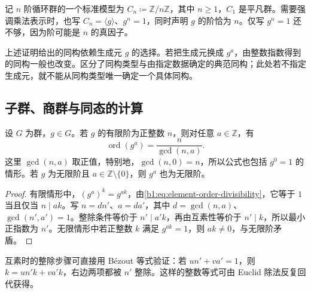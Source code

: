 记 \(n\) 阶循环群的一个标准模型为 \(C_n\coloneqq\mathbb Z/n\mathbb Z\)，其中 \(n\geq1\)，\(C_1\) 是平凡群。需要强调乘法表示时，也写 \(C_n=\langle g\rangle\)、\(g^n=1\)，同时声明 \(g\) 的阶恰为 \(n\)。仅写 \(g^n=1\) 还不够，因为阶可能是 \(n\) 的真因子。

\ProseParagraphBreak
上述证明给出的同构依赖生成元 \(g\) 的选择。若把生成元换成 \(g^a\)，由整数指数得到的同构一般也改变。区分了同构类型与由指定数据确定的典范同构；此处若不指定生成元，就不能从同构类型唯一确定一个具体同构。

\subsection{子群、商群与同态的计算}
\label{b1:subsec:0301:02}

\begin{proposition}\label{b1:prop:power-order}
	设 \(G\) 为群，\(g\in G\)。若 \(g\) 的有限阶为正整数 \(n\)，则对任意 \(a\in\mathbb Z\)，有
	\[
		\operatorname{ord}(g^a)=\frac{n}{\gcd(n,a)}.
	\]
	这里 \(\gcd(n,a)\) 取正值，特别地，\(\gcd(n,0)=n\)，所以公式也包括 \(g^0=1\) 的情形。若 \(g\) 为无限阶且 \(a\in\mathbb Z\setminus\{0\}\)，则 \(g^a\) 也为无限阶。
\end{proposition}
\begin{proof}
	有限情形中，\((g^a)^k=g^{ak}\)，由\eqref{b1:eq:element-order-divisibility}，它等于 \(1\) 当且仅当 \(n\mid ak\)。写 \(n=dn'\)、\(a=da'\)，其中 \(d=\gcd(n,a)\)、\(\gcd(n',a')=1\)。整除条件等价于 \(n'\mid a'k\)，再由互素性等价于 \(n'\mid k\)，所以最小正指数为 \(n'\)。无限情形中若正整数 \(k\) 满足 \(g^{ak}=1\)，则 \(ak\ne0\)，与无限阶矛盾。
\end{proof}

互素时的整除步骤可直接用 Bézout 等式验证：若 \(un'+va'=1\)，则 \(k=un'k+va'k\)，右边两项都被 \(n'\) 整除。这样的整数等式可由 Euclid 除法反复回代获得。


